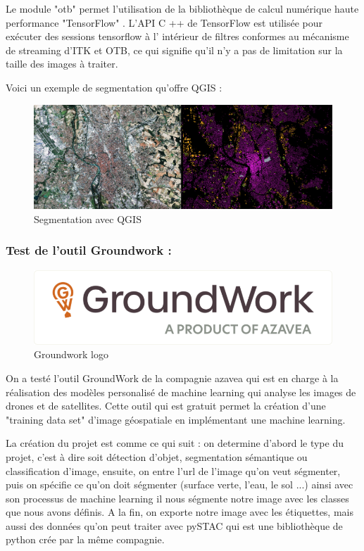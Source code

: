 \documentclass[12pt, openany]{report}
\begin{document}
Le module "otb" permet l'utilisation de la bibliothèque de calcul numérique haute performance "TensorFlow" . L'API C ++ de TensorFlow est utilisée pour exécuter des sessions tensorflow à l' intérieur de filtres conformes au mécanisme de streaming d'ITK et OTB, ce qui signifie qu'il n'y a pas de limitation sur la taille des images à traiter.


Voici un exemple de segmentation qu'offre QGIS :
\begin{figure}[H]
\centering
\noindent
\includegraphics[width=1\textwidth]{test_segmentation.png}
\caption{Segmentation avec QGIS}
\end{figure}

\subsubsection{Test de l'outil Groundwork :}
\begin{figure}[H]
\centering
\includegraphics[scale=0.4]{Groundwork.png}
\caption{Groundwork logo}
\end{figure}

On a testé l'outil GroundWork de la compagnie azavea qui est en charge à la réalisation des modèles personalisé de machine learning qui analyse les images de drones et de satellites.
Cette outil qui est gratuit permet la création d'une "training data set" d'image géospatiale en implémentant une machine learning.
\par
La création du projet est comme ce qui suit : on determine d'abord le type du projet, c'est à dire soit détection d'objet, segmentation sémantique ou classification d'image, ensuite, on entre l'url de l'image qu'on veut ségmenter, puis on spécifie ce qu'on doit ségmenter (surface verte, l'eau, le sol ...) ainsi avec son processus de machine learning il nous ségmente notre image avec les classes que nous avons définis.
A la fin, on exporte notre image avec les étiquettes, mais aussi des données qu'on peut traiter avec pySTAC qui est une bibliothèque de python crée par la même compagnie.
\end{document}
